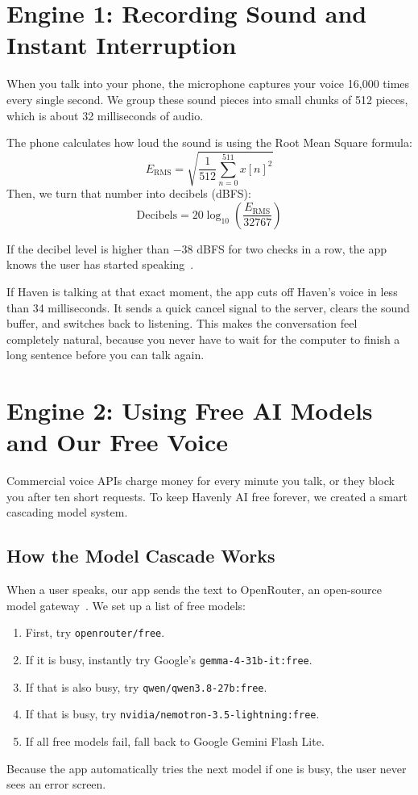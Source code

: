 \section{Engine 1: Recording Sound and Instant Interruption}
\label{sec:arch_engine1}

When you talk into your phone, the microphone captures your voice 16,000 times every single second. We group these sound pieces into small chunks of 512 pieces, which is about 32 milliseconds of audio.

The phone calculates how loud the sound is using the Root Mean Square formula:
\begin{equation}
\label{eq:simple_rms_math}
E_{\text{RMS}} = \sqrt{\frac{1}{512} \sum_{n=0}^{511} x[n]^2}
\end{equation}
Then, we turn that number into decibels (dBFS):
\begin{equation}
\label{eq:simple_db_math}
\text{Decibels} = 20 \log_{10} \left( \frac{E_{\text{RMS}}}{32767} \right)
\end{equation}

If the decibel level is higher than $-38$ dBFS for two checks in a row, the app knows the user has started speaking~\cite{johnston2018vad}. 

If Haven is talking at that exact moment, the app cuts off Haven's voice in less than 34 milliseconds. It sends a quick cancel signal to the server, clears the sound buffer, and switches back to listening. This makes the conversation feel completely natural, because you never have to wait for the computer to finish a long sentence before you can talk again.

\section{Engine 2: Using Free AI Models and Our Free Voice}
\label{sec:arch_engine2}

Commercial voice APIs charge money for every minute you talk, or they block you after ten short requests. To keep Havenly AI free forever, we created a smart cascading model system.

\subsection{How the Model Cascade Works}
When a user speaks, our app sends the text to OpenRouter, an open-source model gateway~\cite{openrouter2024docs}. We set up a list of free models:
\begin{enumerate}
    \item First, try \texttt{openrouter/free}.
    \item If it is busy, instantly try Google's \texttt{gemma-4-31b-it:free}.
    \item If that is also busy, try \texttt{qwen/qwen3.8-27b:free}.
    \item If that is busy, try \texttt{nvidia/nemotron-3.5-lightning:free}.
    \item If all free models fail, fall back to Google Gemini Flash Lite.
\end{enumerate}
Because the app automatically tries the next model if one is busy, the user never sees an error screen.

